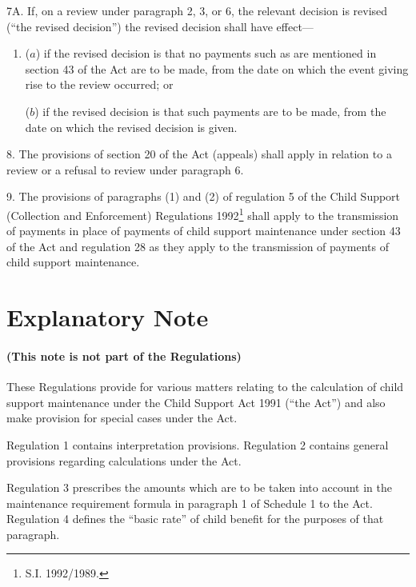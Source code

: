 \documentclass[12pt,a4paper]{article}
\begin{document}
7A.  If, on a review under paragraph 2, 3, or 6, the relevant decision is revised (“the revised decision”) the revised decision shall have effect—
\begin{enumerate}\item[]
($a$) if the revised decision is that no payments such as are mentioned in section 43 of the Act are to be made, from the date on which the event giving rise to the review occurred; or

($b$) if the revised decision is that such payments are to be made, from the date on which the revised decision is given.
\end{enumerate}


\medskip

8.  The provisions of section 20 of the Act (appeals) shall apply in relation to a review or a refusal to review under paragraph 6.

\medskip

9.  The provisions of paragraphs (1) and (2) of regulation 5 of the Child Support (Collection and Enforcement) Regulations 1992\footnote{\frenchspacing  S.I. 1992/1989.} shall apply to the transmission of payments in place of payments of child support maintenance under section 43 of the Act and regulation 28 as they apply to the transmission of payments of child support maintenance.

\part{Explanatory Note}

\renewcommand\parthead{--- Explanatory Note}

\subsection*{(This note is not part of the Regulations)}

These Regulations provide for various matters relating to the calculation of child support maintenance under the Child Support Act 1991 (“the Act”) and also make provision for special cases under the Act.

Regulation 1 contains interpretation provisions. Regulation 2 contains general provisions regarding calculations under the Act.

Regulation 3 prescribes the amounts which are to be taken into account in the maintenance requirement formula in paragraph 1 of Schedule 1 to the Act. Regulation 4 defines the “basic rate” of child benefit for the purposes of that paragraph.
\end{document}
